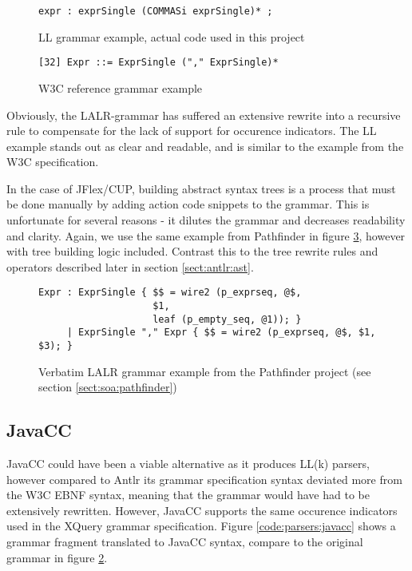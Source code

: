 \begin{figure}[h!]
\begin{Verbatim}
expr : exprSingle (COMMASi exprSingle)* ;
\end{Verbatim}
\caption[LL grammar example]{LL grammar example, actual code used in this project}
\label{code:parsers:ll}
\end{figure}

\begin{figure}[h!]
\begin{Verbatim}
[32] Expr ::= ExprSingle ("," ExprSingle)*
\end{Verbatim}
\caption{ W3C reference grammar example }
\label{code:parsers:w3c}
\end{figure}

Obviously, the LALR-grammar has suffered an extensive rewrite into a recursive
rule to compensate for the lack of support for occurence indicators. The LL
example stands out as clear and readable, and is similar to the example from the
W3C specification.

In the case of JFlex/CUP, building abstract syntax trees is a process that must
be done manually by adding action code snippets to the grammar. This is
unfortunate for several reasons - it dilutes the grammar and decreases
readability and clarity. Again, we use the same example from Pathfinder in
figure \ref{code:parsers:lalr2}, however with tree building logic included.
Contrast this to the tree rewrite rules and operators described later in section
\ref{sect:antlr:ast}.

\begin{figure}[h!]
\begin{Verbatim}
Expr : ExprSingle { $$ = wire2 (p_exprseq, @$,
                    $1,
                    leaf (p_empty_seq, @1)); }
     | ExprSingle "," Expr { $$ = wire2 (p_exprseq, @$, $1, $3); }
\end{Verbatim}
\caption[LALR grammar example]{Verbatim LALR grammar example from the Pathfinder
project (see section \ref{sect:soa:pathfinder})}
\label{code:parsers:lalr2}
\end{figure}

\subsection{JavaCC}
JavaCC could have been a viable alternative as it produces LL(k) parsers,
however compared to Antlr its grammar specification syntax deviated more
from the W3C EBNF syntax, meaning that the grammar would have had to be
extensively rewritten. However, JavaCC supports the same occurence indicators
used in the XQuery grammar specification. Figure \ref{code:parsers:javacc} shows
a grammar fragment translated to JavaCC syntax, compare to the original grammar
in figure \ref{code:parsers:w3c}.

